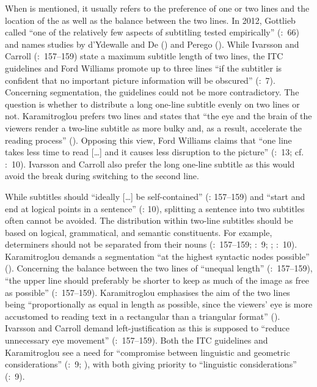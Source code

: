 When  is mentioned, it usually refers to the preference of one or two lines and the location of the  as well as the balance between the two lines. In 2012, Gottlieb called  “one of the relatively few aspects of subtitling tested empirically” (\citeyear{Gottlieb2012}:~66) and names studies by d’Ydewalle and De (\citeyear{Dydewalle2007}) and Perego (\citeyear{perego2010}). While Ivarsson and Carroll (\citeyear{Ivarsson1998}:~157--159) state a maximum subtitle length of two lines, the ITC guidelines and Ford Williams promote up to three lines “if the subtitler is confident that no important picture information will be obscured” (\citealt{Itc1999}:~7). Concerning segmentation, the guidelines could not be more contradictory. The question is whether to distribute a long one-line subtitle evenly on two lines or not. Karamitroglou prefers two lines and states that “the eye and the brain of the viewers render a two-line subtitle as more bulky and, as a result, accelerate the reading process” (\citeyear{Karamitroglou1998}). Opposing this view, Ford Williams claims that “one line takes less time to read […] and it causes less disruption to the picture” (\citeyear{Ford_williams2009}:~13; cf. \citealt{Itc1999}:~10). Ivarsson and Carroll also prefer the long one-line subtitle as this would avoid the break during switching to the second line.

While subtitles should “ideally […] be self-contained” (\citealt{Ivarsson1998}: 157--159) and “start and end at logical points in a sentence” (\citealt{Ford_williams2009}: 10), splitting a sentence into two subtitles often cannot be avoided. The distribution within two-line subtitles should be based on logical, grammatical, and semantic constituents. For example, determiners should not be separated from their nouns (\citealt{Ivarsson1998}:~157--159; \citealt{Itc1999}:~9; \citealt{Diaz_cintas2007}; \citealt{Ford_williams2009}:~10). Karamitroglou demands a segmentation “at the highest syntactic nodes possible” (\citeyear{Karamitroglou1998}). Concerning the balance between the two lines of “unequal length” (\citealt{Ivarsson1998}:~157--159), “the upper line should preferably be shorter to keep as much of the image as free as possible” (\citealt{Ivarsson1998}:~157--159). Karamitroglou emphasises the aim of the two lines being “proportionally as equal in length as possible, since the viewers’ eye is more accustomed to reading text in a rectangular than a triangular format” (\citeyear{Karamitroglou1998}). Ivarsson and Carroll demand left-justification as this is supposed to “reduce unnecessary eye movement” (\citealt{Ivarsson1998}:~157--159). Both the ITC guidelines and Karamitroglou see a need for “compromise between linguistic and geometric considerations” (\citealt{Itc1999}:~9; \citealt{Karamitroglou1998}), with both giving priority to “linguistic considerations” (\citealt{Itc1999}:~9).

